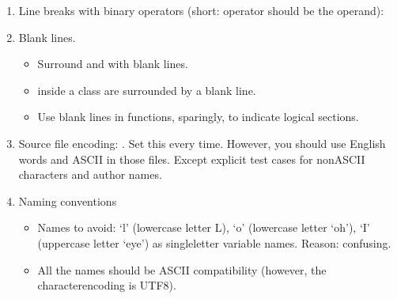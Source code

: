 \documentclass[letterpaper,10pt,english]{sphinxmanual}
\begin{document}
\begin{enumerate}
\item {} 
Line breaks with binary operators (short: operator should be  the operand):

\begin{sphinxVerbatim}[commandchars=\\\{\}]
  
           
             
           
           
\end{sphinxVerbatim}

\item {} 
Blank lines.
\begin{itemize}
\item {} 
Surround  and  with  blank lines.

\item {} 
 inside a class are surrounded by a  blank line.

\item {} 
Use blank lines in functions, sparingly, to indicate logical sections.

\end{itemize}

\item {} 
Source file encoding: . Set this every time. However, you should use English words and ASCII  in those files. Except explicit test cases for non\sphinxhyphen{}ASCII characters and author names.

\item {} 
Naming conventions
\begin{itemize}
\item {} 
Names to avoid: ‘l’ (lowercase letter L), ‘o’ (lowercase letter ‘oh’), ‘I’ (uppercase letter ‘eye’) as single\sphinxhyphen{}letter variable names. Reason: confusing.

\item {} 
All the names should be ASCII compatibility (however, the character\sphinxhyphen{}encoding is UTF\sphinxhyphen{}8).


\end{itemize}
\end{enumerate}
\end{document}
